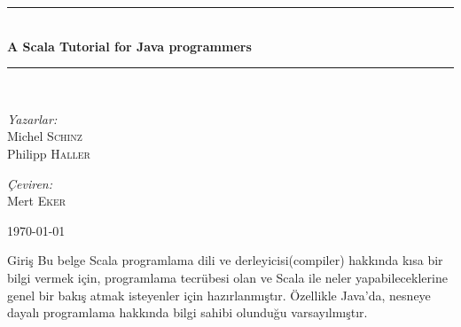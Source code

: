 \documentclass[10pt,a4paper]{book}
\newcommand{\HRule}{\rule{\linewidth}{0.5mm}}
\begin{document}
\begin{titlepage}
\begin{center}
\HRule \\[1.5cm]
{ \huge \bfseries A Scala Tutorial for Java programmers}\\[1.5cm]
\HRule \\[1.5cm]

\begin{minipage}{0.4\textwidth}
\begin{flushleft} \large
\emph{Yazarlar:}\\
Michel \textsc{Schinz}\\
Philipp \textsc{Haller}
\end{flushleft}
\end{minipage}
\begin{minipage}{0.4\textwidth}
\begin{flushright} \large
\emph{Çeviren:} \\
Mert \textsc{Eker}\\

\end{flushright}
\end{minipage}
\vfill
{\large \today}

\end{center}
\end{titlepage}
\tableofcontents

\begin{chapter}{Giriş}
Bu belge Scala programlama dili ve derleyicisi(compiler) hakkında kısa bir bilgi vermek için, programlama tecrübesi olan ve Scala ile neler yapabileceklerine genel bir bakış atmak isteyenler için hazırlanmıştır. Özellikle Java'da, nesneye dayalı programlama hakkında bilgi sahibi olunduğu varsayılmıştır.
\end{chapter}
\end{document}

